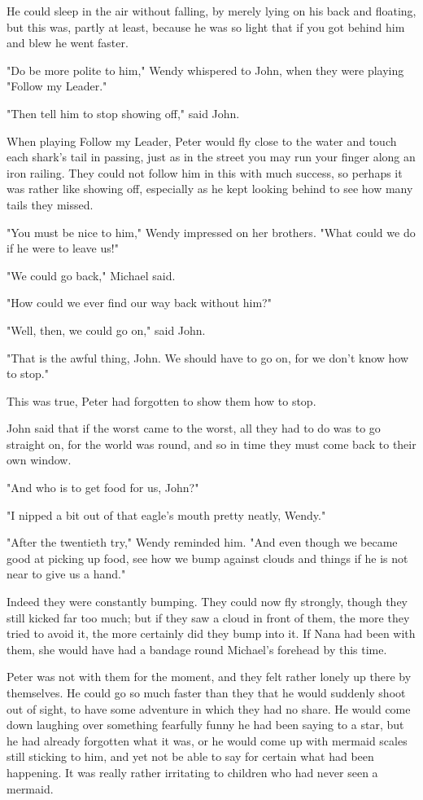 He could sleep in the air without falling, by merely lying on his back and floating,
but this was, partly at least, because he was so light that if you got behind him and blew he went faster.

"Do be more polite to him," Wendy whispered to John,
when they were playing "Follow my Leader."

"Then tell him to stop showing off," said John.

When playing Follow my Leader, Peter would fly close to the water and touch each shark's tail in passing,
just as in the street you may run your finger along an iron railing.
They could not follow him in this with much success, so perhaps it was rather like showing off,
especially as he kept looking behind to see how many tails they missed.

"You must be nice to him," Wendy impressed on her brothers.
"What could we do if he were to leave us!"

"We could go back," Michael said.

"How could we ever find our way back without him?"

"Well, then, we could go on," said John.

"That is the awful thing, John.
We should have to go on, for we don't know how to stop."

This was true, Peter had forgotten to show them how to stop.

John said that if the worst came to the worst, all they had to do was to go straight on,
for the world was round, and so in time they must come back to their own window.

"And who is to get food for us, John?"

"I nipped a bit out of that eagle's mouth pretty neatly, Wendy."

"After the twentieth try," Wendy reminded him.
"And even though we became good at picking up food,
see how we bump against clouds and things if he is not near to give us a hand."

Indeed they were constantly bumping.
They could now fly strongly, though they still kicked far too much;
but if they saw a cloud in front of them, the more they tried to avoid it,
the more certainly did they bump into it.
If Nana had been with them, she would have had a bandage round Michael's forehead by this time.

Peter was not with them for the moment,
and they felt rather lonely up there by themselves.
He could go so much faster than they that he would suddenly shoot out of sight,
to have some adventure in which they had no share.
He would come down laughing over something fearfully funny he had been saying to a star,
but he had already forgotten what it was,
or he would come up with mermaid scales still sticking to him,
and yet not be able to say for certain what had been happening.
It was really rather irritating to children who had never seen a mermaid.

